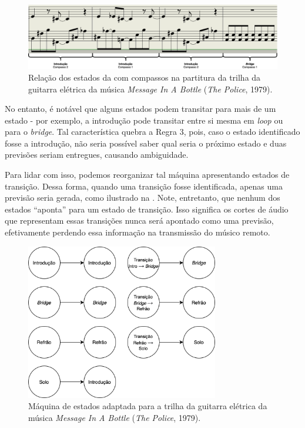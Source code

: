 \begin{figure}[htbp]
    \centering
    \includegraphics[width=1\textwidth]{images/dtw-real division.png}
    \caption{Relação dos estados da  com compassos na partitura da trilha da guitarra elétrica da música \textit{Message In A Bottle} (\textit{The Police}, 1979).}
    \label{fig:miab_sheet_music}
\end{figure}

No entanto, é notável que alguns estados podem transitar para mais de um estado - por exemplo, a introdução pode transitar entre si mesma em \textit{loop} ou para o \textit{bridge}. Tal característica quebra a Regra 3, pois, caso o estado identificado fosse a introdução, não seria possível saber qual seria o próximo estado e duas previsões seriam entregues, causando ambiguidade.

Para lidar com isso, podemos reorganizar tal máquina apresentando estados de transição. Dessa forma, quando uma transição fosse identificada, apenas uma previsão seria gerada, como ilustrado na . Note, entretanto, que nenhum dos estados ``aponta'' para um estado de transição. Isso significa os cortes de áudio que representam essas transições nunca será apontado como uma previsão, efetivamente perdendo essa informação na transmissão do músico remoto.

\begin{figure}[htbp]
    \centering
    \includegraphics[width=0.75\textwidth]{images/MIAB adapted state machine.png}
    \caption{Máquina de estados adaptada para a trilha da guitarra elétrica da música \textit{Message In A Bottle} (\textit{The Police}, 1979).}
    \label{fig:miab_adapted_state_machine}
\end{figure}

